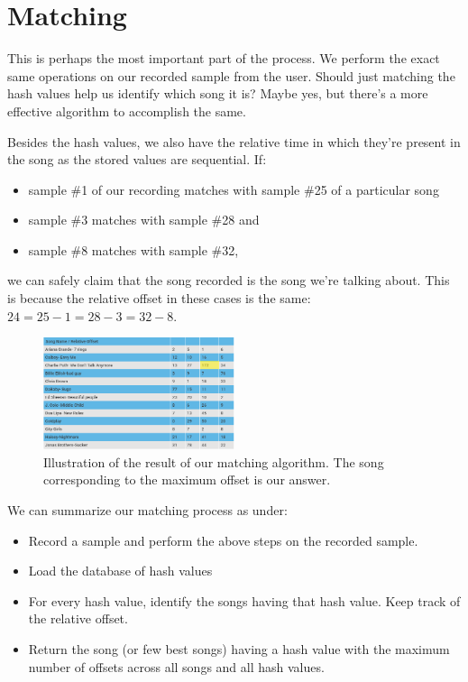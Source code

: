 \documentclass[12pt, a4paper]{IEEEtran}
\begin{document}
\section{Matching}
This is perhaps the most important part of the process.
We perform the exact same operations on our recorded sample from the user.
Should just matching the hash values help us identify which song it is? Maybe yes, but there's a more effective algorithm to accomplish the same.
\par
Besides the hash values, we also have the relative time in which they're present in the song as the stored values are sequential.
If:
\begin{itemize}
    \item sample \#1 of our recording matches with sample \#25 of a particular song
    \item sample \#3 matches with sample \#28 and
    \item sample \#8 matches with sample \#32,   
\end{itemize}
we can safely claim that the song recorded is the song we're talking about.
This is because the relative offset in these cases is the same: \(24 = 25 - 1 = 28 - 3 = 32 - 8\). \\
\begin{figure}[h]
    \begin{center}
        \includegraphics[width=0.5\textwidth]{matching.png}    
    \end{center}
    \captionsetup{justification=centering}
    \caption{Illustration of the result of our matching algorithm. The song corresponding to the maximum offset is our answer.}
\end{figure}
\par
We can summarize our matching process as under:

\begin{itemize}
    \item Record a sample and perform the above steps on the recorded sample.
    \item Load the database of hash values
    \item For every hash value, identify the songs having that hash value. Keep track of the relative offset.
    \item Return the song (or few best songs) having a hash value with the maximum number of offsets across all songs and all hash values.
\end{itemize}
\end{document}
